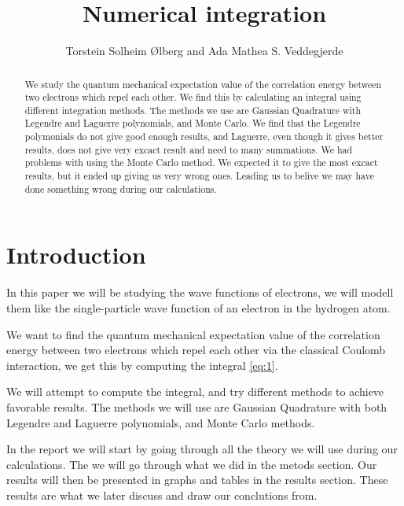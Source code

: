 \documentclass{emulateapj}
\begin{document}
	
	\title{Numerical integration}
	
	\author{Torstein Solheim Ølberg and Ada Mathea S. Veddegjerde}
	
	
	
	\begin{abstract}
		We study the quantum mechanical expectation value of the correlation energy between two electrons which repel each other. We find this by calculating an integral using different integration methods. The methods we use are Gaussian Quadrature with Legendre and Laguerre polynomials, and Monte Carlo. We find that the Legendre polymonials do not give good enough results, and Laguerre, even though it gives better results, does not give very excact result and need to many summations. We had problems with using the Monte Carlo method. We expected it to give the most excact results, but it ended up giving us very wrong ones. Leading us to belive we may have done something wrong during our calculations.
	\end{abstract}
	
	\section{Introduction}
	\label{sec:introduction}
	In this paper we will be studying the wave functions of electrons, we will modell them like the single-particle wave function of an electron in the hydrogen atom. \par
	We want to find the quantum mechanical expectation value of the correlation energy between two electrons which repel each other via the classical Coulomb interaction, we get this by computing the integral \ref{eq:1}.\par
	We will attempt to compute the integral, and try different methods to achieve favorable results. The methods we will use are Gaussian Quadrature with both Legendre and Laguerre polynomials, and Monte Carlo methods.\par
	In the report we will start by going through all the theory we will use during our calculations. The we will go through what we did in the metods section. Our results will then be presented in graphs and tables in the results section. These results are what we later discuss and draw our conclutions from.
	
\end{document}
